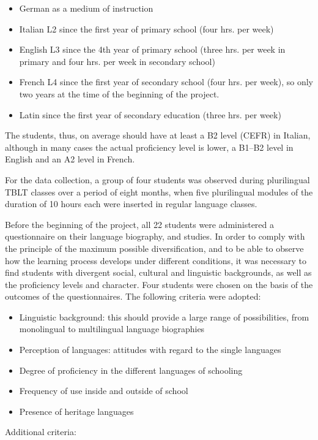 \documentclass[output=paper]{../langscibook}
\begin{document}
\begin{itemize}[noitemsep]
\item German as a medium of instruction
\item Italian L2 since the first year of primary school (four hrs. per week)
\item English L3 since the 4th year of primary school (three hrs. per week in primary and four hrs. per week in secondary school)
\item French L4 since the first year of secondary school (four hrs. per week), so only two years at the time of the beginning of the project. 
\item Latin since the first year of secondary education (three hrs. per week)
\end{itemize}

The students, thus, on average should have at least a B2 level (CEFR) in Italian, although in many cases the actual proficiency level is lower, a B1--B2 level in English and an A2 level in French. 

For the data collection, a group of four students was observed during plurilingual TBLT classes over a period of eight months, when five plurilingual modules of the duration of 10 hours each were inserted in regular language classes.  

Before the beginning of the project, all 22 students were administered a questionnaire on their language biography, and studies. In order to comply with the principle of the maximum possible diversification, and to be able to observe how the learning process develops under different conditions, it was necessary to find students with divergent social, cultural and linguistic backgrounds, as well as the proficiency levels and character. Four students were chosen on the basis of the outcomes of the questionnaires. The following criteria were adopted:

\begin{itemize}[noitemsep]
\item Linguistic background: this should provide a large range of possibilities, from monolingual to multilingual language biographies
\item Perception of languages: attitudes with regard to the single languages
\item Degree of proficiency in the different languages of schooling 
\item Frequency of use inside and outside of school 
\item Presence of heritage languages
\end{itemize}
Additional criteria:
\end{document}
